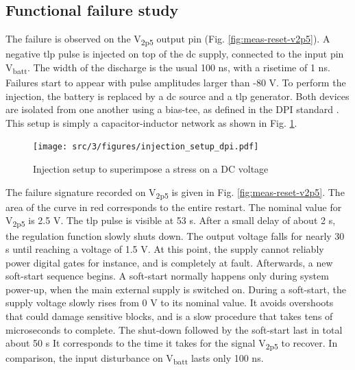 \subsection{Functional failure study}
\label{sec:failure-case-study}

The failure is observed on the V\textsubscript{2p5} output pin (Fig. \ref{fig:meas-reset-v2p5}).
A negative \gls{tlp} pulse is injected on top of the \gls{dc} supply, connected to the input pin V\textsubscript{batt}.
The width of the discharge is the usual 100 ns, with a risetime of 1 ns.
Failures start to appear with pulse amplitudes larger than -80 V.
To perform the injection, the battery is replaced by a \gls{dc} source and a \gls{tlp} generator.
Both devices are isolated from one another using a \gls{bias-tee}, as defined in the DPI standard \cite{iec62132-4}.
This setup is simply a capacitor-inductor network as shown in Fig. \ref{fig:injection-setup-dpi}.

\begin{figure}[!h]
  \centering
  \texttt{[image: src/3/figures/injection\_setup\_dpi.pdf]}
  \caption{Injection setup to superimpose a stress on a DC voltage}
  \label{fig:injection-setup-dpi}
\end{figure}


The failure signature recorded on V\textsubscript{2p5} is given in Fig. \ref{fig:meas-reset-v2p5}.
The area of the curve in red corresponds to the entire restart.
The nominal value for V\textsubscript{2p5} is 2.5 V.
The \gls{tlp} pulse is visible at 53 \textmu{}s.
After a small delay of about 2 \textmu{}s, the regulation function slowly shuts down.
The output voltage falls for nearly 30 \textmu{}s until reaching a voltage of 1.5 V.
At this point, the supply cannot reliably power digital gates for instance, and is completely at fault.
Afterwards, a new soft-start sequence begins.
A soft-start normally happens only during system power-up, when the main external supply is switched on.
During a soft-start, the supply voltage slowly rises from 0 V to its nominal value.
It avoids overshoots that could damage sensitive blocks, and is a slow procedure that takes tens of microseconds to complete.
The shut-down followed by the soft-start last in total about 50 \textmu{}s
It corresponds to the time it takes for the signal V\textsubscript{2p5} to recover.
In comparison, the input disturbance on V\textsubscript{batt} lasts only 100 ns.

